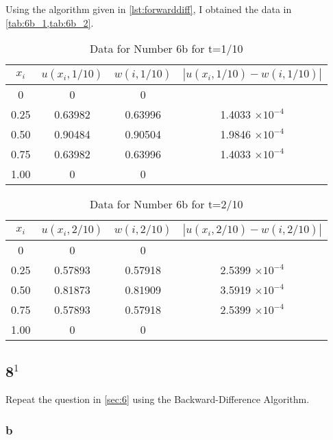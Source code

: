 \documentclass[12pt]{article}
\begin{document}
Using the algorithm given in \cref{lst:forwarddiff}, I obtained the
data in \cref{tab:6b_1,tab:6b_2}.

\begin{table}[H]
  \centering
  \begin{tabular}[p]{cccc}
    \hline
    $x_i$ & $u(x_i,1/10)$ & $w(i,1/10)$ & $|u(x_i,1/10)-w(i,1/10)|$ \\
    \hline
    0 & 0 & 0 & \\
    0.25 & 0.63982 & 0.63996 & 1.4033 $\times 10^{-4}$ \\
    0.50 & 0.90484 & 0.90504 & 1.9846 $\times 10^{-4}$ \\
    0.75 & 0.63982 & 0.63996 & 1.4033 $\times 10^{-4}$ \\
    1.00 & 0 & 0 & \\
    \hline
  \end{tabular}
  \caption{Data for Number 6b for t=1/10}
  \label{tab:6b_1}
\end{table}

\begin{table}[H]
  \centering
  \begin{tabular}[p]{cccc}
    \hline
    $x_i$ & $u(x_i,2/10)$ & $w(i,2/10)$ & $|u(x_i,2/10)-w(i,2/10)|$ \\
    \hline
    0 & 0 & 0 & \\
    0.25 & 0.57893 & 0.57918 & 2.5399 $\times 10^{-4}$ \\
    0.50 & 0.81873 & 0.81909 & 3.5919 $\times 10^{-4}$ \\
    0.75 & 0.57893 & 0.57918 & 2.5399 $\times 10^{-4}$ \\
    1.00 & 0 & 0 & \\
    \hline
  \end{tabular}
  \caption{Data for Number 6b for t=2/10}
  \label{tab:6b_2}
\end{table}

\subsection{8$^1$}
Repeat the question in \cref{sec:6} using the Backward-Difference Algorithm.

\subsubsection{b}
\end{document}

